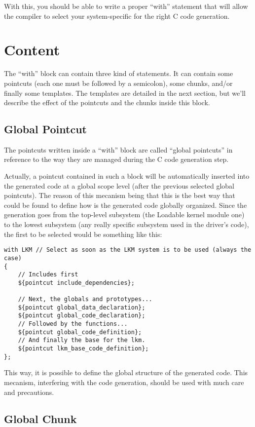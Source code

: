 \documentclass[american]{rtxreport}
\begin{document}
With this, you should be able to write a proper ``with'' statement that will
allow the compiler to select your system-specific for the right C code
generation.

\section{Content}

The ``with'' block can contain three kind of statements. It can contain some
pointcuts (each one must be followed by a semicolon), some chunks, and/or
finally some templates. The templates are detailed in the next section, but
we'll describe the effect of the pointcuts and the chunks inside this block.

\subsection{Global Pointcut}

The pointcuts written inside a ``with'' block are called ``global pointcuts''
in reference to the way they are managed during the C code generation step.

Actually, a pointcut contained in such a block will be automatically inserted
into the generated code at a global scope level (after the previous selected
global pointcuts). The reason of this mecanism being that this is the best way
that could be found to define how is the generated code globally organized.
Since the generation goes from the top-level subsystem (the Loadable kernel
module one) to the lowest subsystem (any really specific subsystem used in the
driver's code), the first to be selected would be something like this:
\begin{lstlisting}
with LKM // Select as soon as the LKM system is to be used (always the case)
{
    // Includes first
    ${pointcut include_dependencies};

    // Next, the globals and prototypes...
    ${pointcut global_data_declaration};
    ${pointcut global_code_declaration};
    // Followed by the functions...
    ${pointcut global_code_definition};
    // And finally the base for the lkm.
    ${pointcut lkm_base_code_definition};
};
\end{lstlisting}

This way, it is possible to define the global structure of the generated code.
This mecanism, interfering with the code generation, should be used with much
care and precautions.


\subsection{Global Chunk}
\end{document}
